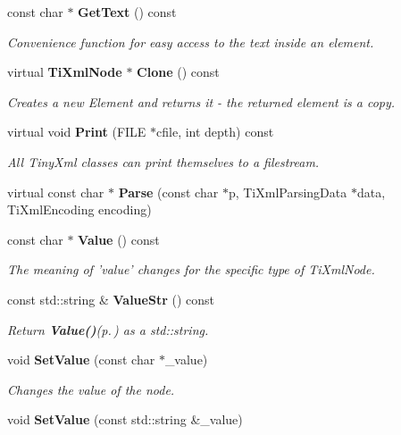 \begin{CompactItemize}
\item 
const char $\ast$ {\bf Get\-Text} () const
\begin{CompactList}\small\item\em Convenience function for easy access to the text inside an element. \item\end{CompactList}\item 
virtual {\bf Ti\-Xml\-Node} $\ast$ {\bf Clone} () const\label{classTiXmlElement_TiXmlElementa28}

\begin{CompactList}\small\item\em Creates a new Element and returns it - the returned element is a copy. \item\end{CompactList}\item 
virtual void {\bf Print} (FILE $\ast$cfile, int depth) const
\begin{CompactList}\small\item\em All Tiny\-Xml classes can print themselves to a filestream. \item\end{CompactList}\item 
virtual const char $\ast$ {\bf Parse} (const char $\ast$p, Ti\-Xml\-Parsing\-Data $\ast$data, Ti\-Xml\-Encoding encoding)\label{classTiXmlElement_TiXmlElementa30}

\item 
const char $\ast$ {\bf Value} () const
\begin{CompactList}\small\item\em The meaning of 'value' changes for the specific type of Ti\-Xml\-Node. \item\end{CompactList}\item 
const std::string \& {\bf Value\-Str} () const
\begin{CompactList}\small\item\em Return {\bf Value()}{\rm (p.\,\pageref{classTiXmlNode_TiXmlUnknowna7})} as a std::string. \item\end{CompactList}\item 
void {\bf Set\-Value} (const char $\ast$\_\-value)
\begin{CompactList}\small\item\em Changes the value of the node. \item\end{CompactList}\item 
void {\bf Set\-Value} (const std::string \&\_\-value)\label{classTiXmlNode_TiXmlUnknowna10}


\end{CompactItemize}
